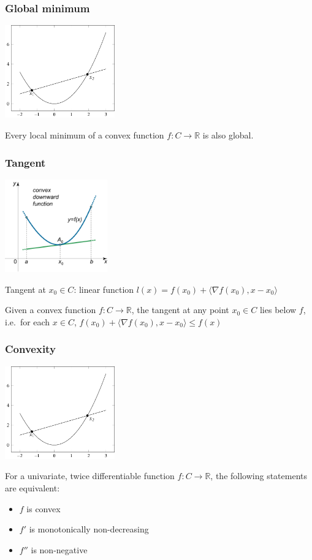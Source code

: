 \documentclass[10pt]{beamer}
\begin{document}
\begin{frame}
  \frametitle{Global minimum}
  \begin{center}
  \includegraphics[height=4cm]{images/convexfun.png}
  \end{center}
  \begin{theorem}
	Every local minimum of a convex function $f:C\rightarrow\mathbb{R}$ is also global.
  \end{theorem}
\end{frame}

\begin{frame}
  \frametitle{Tangent}
  \begin{center}
  \includegraphics[height=4cm]{images/tangent.png}
  \end{center}
  Tangent at $x_0\in C$: linear function $l(x) = f(x_0) + \langle \nabla f(x_0), x - x_0 \rangle$
  \begin{theorem}
	Given a convex function $f:C\rightarrow\mathbb{R}$, the tangent at any point $x_0\in C$ lies below $f$, i.e.~for each $x\in C$, $f(x_0) + \langle \nabla f(x_0), x - x_0 \rangle \leq f(x)$
  \end{theorem}
\end{frame}

\begin{frame}
  \frametitle{Convexity}
  \begin{center}
  \includegraphics[height=4cm]{images/convexfun.png}
  \end{center}
  For a {\color{red} univariate}, twice differentiable function $f:C\rightarrow\mathbb{R}$, the following statements are equivalent:
  \begin{itemize}
	\item $f$ is convex
	\item $f'$ is monotonically non-decreasing
	\item $f''$ is non-negative
  \end{itemize}
\end{frame}
\end{document}
